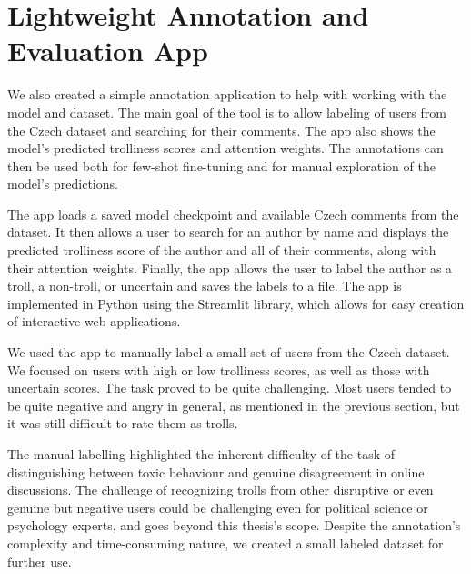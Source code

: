 \documentclass[twoside]{ctuthesis}
\theoremstyle{plain}
\theoremstyle{definition}
\theoremstyle{note}
\begin{document}
\section{Lightweight Annotation and Evaluation App}

We also created a simple annotation application to help with working with the model and dataset. The main goal of the tool is to allow labeling of users from the Czech dataset and searching for their comments. The app also shows the model's predicted trolliness scores and attention weights. The annotations can then be used both for few-shot fine-tuning and for manual exploration of the model's predictions.\par
The app loads a saved model checkpoint and available Czech comments from the dataset. It then allows a user to search for an author by name and displays the predicted trolliness score of the author and all of their comments, along with their attention weights. Finally, the app allows the user to label the author as a troll, a non-troll, or uncertain and saves the labels to a file. The app is implemented in Python using the Streamlit library, which allows for easy creation of interactive web applications.\par
We used the app to manually label a small set of users from the Czech dataset. We focused on users with high or low trolliness scores, as well as those with uncertain scores. The task proved to be quite challenging. Most users tended to be quite negative and angry in general, as mentioned in the previous section, but it was still difficult to rate them as trolls. \par
The manual labelling highlighted the inherent difficulty of the task of distinguishing between toxic behaviour and genuine disagreement in online discussions. The challenge of recognizing trolls from other disruptive or even genuine but negative users could be challenging even for political science or psychology experts, and goes beyond this thesis's scope. Despite the annotation's complexity and time-consuming nature, we created a small labeled dataset for further use. \par
\end{document}
